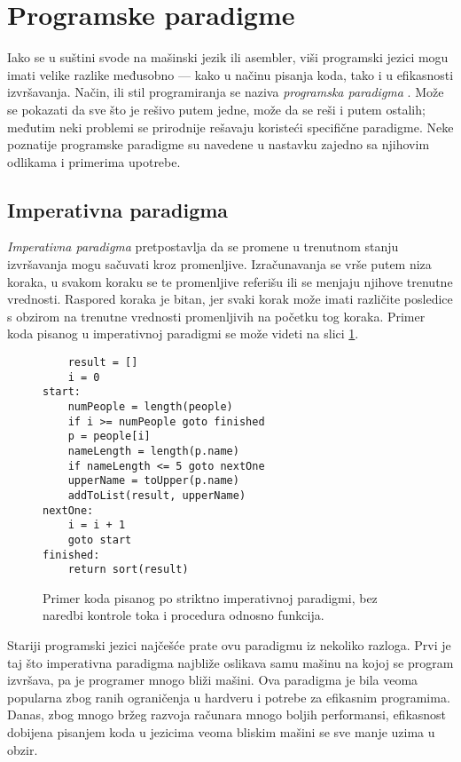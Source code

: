 \section{Programske paradigme}
\label{sec:Paradigms}

Iako se u suštini svode na mašinski jezik ili asembler, viši programski jezici mogu imati velike razlike međusobno --- kako u načinu pisanja koda, tako i u efikasnosti izvršavanja. Način, ili stil programiranja se naziva \emph{programska paradigma} \cite{ProgrammingParadigms}. Može se pokazati da sve što je rešivo putem jedne, može da se reši i putem ostalih; međutim neki problemi se prirodnije rešavaju koristeći specifične paradigme. Neke poznatije programske paradigme su navedene u nastavku zajedno sa njihovim odlikama i primerima upotrebe.


\subsection{Imperativna paradigma}
\label{subsec:ParadigmImperative}

\emph{Imperativna paradigma} pretpostavlja da se promene u trenutnom stanju izvršavanja mogu sačuvati kroz promenljive. Izračunavanja se vrše putem niza koraka, u svakom koraku se te promenljive referišu ili se menjaju njihove trenutne vrednosti. Raspored koraka je bitan, jer svaki korak može imati različite posledice s obzirom na trenutne vrednosti promenljivih na početku tog koraka. Primer koda pisanog u imperativnoj paradigmi se može videti na slici \ref{fig:ParadigmImperative}.

\begin{figure}[h!]
\begin{lstlisting}
    result = []
    i = 0
start:
    numPeople = length(people)
    if i >= numPeople goto finished
    p = people[i]
    nameLength = length(p.name)
    if nameLength <= 5 goto nextOne
    upperName = toUpper(p.name)
    addToList(result, upperName)
nextOne:
    i = i + 1
    goto start
finished:
    return sort(result)
\end{lstlisting}
\caption{Primer koda pisanog po striktno imperativnoj paradigmi, bez naredbi kontrole toka i procedura odnosno funkcija.}
\label{fig:ParadigmImperative}
\end{figure}

Stariji programski jezici najčešće prate ovu paradigmu iz nekoliko razloga. Prvi je taj što imperativna paradigma najbliže oslikava samu mašinu na kojoj se program izvršava, pa je programer mnogo bliži mašini. Ova paradigma je bila veoma popularna zbog ranih ograničenja u hardveru i potrebe za efikasnim programima. Danas, zbog mnogo bržeg razvoja računara mnogo boljih performansi, efikasnost dobijena pisanjem koda u jezicima veoma bliskim mašini se sve manje uzima u obzir.

